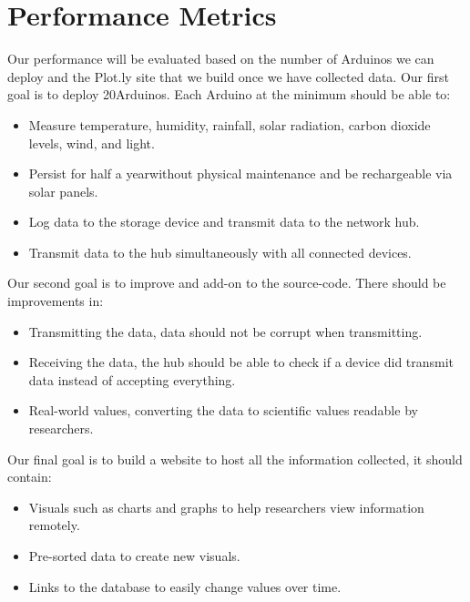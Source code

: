 \documentclass[onecolumn, draftclsnofoot,10pt, compsoc]{IEEEtran}
\begin{document}
\section {Performance Metrics}
Our performance will be evaluated based on the number of Arduinos we can deploy and the Plot.ly site that we build once we have collected data. 
\newline
Our first goal is to deploy 20\footnotemark Arduinos.  Each Arduino at the minimum should be able to:
\begin{itemize}
\item Measure temperature, humidity, rainfall, solar radiation, carbon dioxide levels, wind, and light.
\item Persist for half a year\footnotemark without physical maintenance and be rechargeable via solar panels.
\item Log data to the storage device and transmit data to the network hub.
\item Transmit data to the hub simultaneously with all connected devices.
\end{itemize}
Our second goal is to improve and add-on to the source-code.  There should be improvements in:
\begin{itemize}
\item Transmitting the data, data should not be corrupt when transmitting.
\item Receiving the data, the hub should be able to check if a device did transmit data instead of accepting everything.
\item Real-world values, converting the data to scientific values readable by researchers.
\end{itemize}
Our final goal is to build a website to host all the information collected, it should contain:
\begin{itemize}
\item Visuals such as charts and graphs to help researchers view information remotely.
\item Pre-sorted data to create new visuals.
\item Links to the database to easily change values over time.
\end{itemize}
\end{document}
